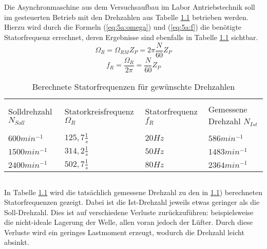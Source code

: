 \chapter{}
\section{}\label{sec:5a}

Die Asynchronmaschine aus dem Versuchsaufbau im Labor Antriebstechnik soll im gesteuerten Betrieb mit den Drehzahlen aus Tabelle \ref{tab:5a:Drehzahlen} betrieben werden. Hierzu wird durch die Formeln (\ref{eq:5a:omega}) und (\ref{eq:5a:f}) die benötigte Statorfrequenz errechnet, deren Ergebnisse sind ebenfalls in Tabelle \ref{tab:5a:Drehzahlen} sichtbar.
\begin{equation}
	\Omega_{R} = \Omega_{RM}Z_{P} = 2\pi\frac{N}{60}Z_{P}
	\label{eq:5a:omega}
\end{equation}
\begin{equation}
	f_{R} = \frac{\Omega_{R}}{2\pi} = \frac{N}{60}Z_{P}
\label{eq:5a:f}
\end{equation}

\begin{table}[h]
	\centering
	\begin{tabular}{p{3.6cm} | p{3.6cm} | p{3.6cm} | p{3.6cm}}
		&&&\\[-1em]
		Solldrehzahl $ N_{Soll} $ & Statorkreisfrequenz $ \Omega_{R} $ & Statorfrequenz $ f_{R} $ &  Gemessene Drehzahl $ N_{Ist} $\\
		\hline &&&\\[-1em]
		$ 600 min^{-1} $ & $ 125,7\frac{1}{s} $ & $ 20Hz $ & $ 586 min^{-1} $\\
		$ 1500 min^{-1} $ & $ 314,2\frac{1}{s} $ & $ 50Hz $ & $ 1483 min^{-1} $ \\
		$ 2400 min^{-1} $ & $ 502,7\frac{1}{s} $ & $ 80Hz $ & $ 2364 min^{-1} $ \\
	\end{tabular}
	\caption{Berechnete Statorfrequenzen für gewünschte Drehzahlen}
	\label{tab:5a:Drehzahlen}
\end{table}

\section{}
In Tabelle \ref{tab:5a:Drehzahlen} wird die tatsächlich gemessene Drehzahl zu den in \ref{sec:5a}) berechneten Statorfrequenzen gezeigt. Dabei ist die Ist-Drehzahl jeweils etwas geringer als die Soll-Drehzahl. Dies ist auf verschiedene Verluste zurückzuführen: beispielsweise die nicht-ideale Lagerung der Welle, allen voran jedoch der Lüfter. Durch diese Verluste wird ein geringes Lastmoment erzeugt, wodurch die Drehzahl leicht absinkt.
